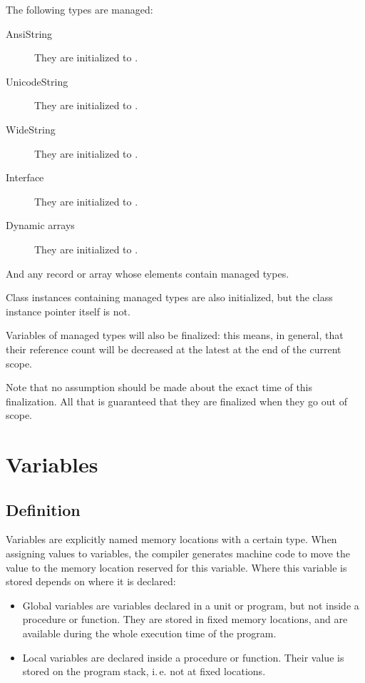 The following types are managed:
\begin{description}
\item[AnsiString] They are initialized  to .
\item[UnicodeString] They are initialized  to .
\item[WideString] They are initialized  to .
\item[Interface] They are initialized  to .
\item[Dynamic arrays] They are initialized  to .
\end{description}
And any record or array whose elements contain managed types.

Class instances containing managed types are also initialized, but the class
instance pointer itself is not.

Variables of managed types will also be finalized: this means, in general, that their
reference count will be decreased at the latest at the end of the current scope.

\begin{remark}
Note that no assumption should be made about the exact time of this
finalization. All that is guaranteed that they are finalized when they go
out of scope.
\end{remark}

\chapter{Variables}
\label{ch:Variables}
\section{Definition}
Variables are explicitly named memory locations with a certain type. When
assigning values to variables, the \fpc compiler generates machine code
to move the value to the memory location reserved for this variable. Where
this variable is stored depends on where it is declared:

\begin{itemize}
\item Global variables are variables declared in a unit or program, but not
inside a procedure or function. They are stored in fixed memory locations,
and are available during the whole execution time of the program.
\item Local variables are declared inside a procedure or function. Their
value is stored on the program stack, i.\,e. not at fixed locations.
\end{itemize}

